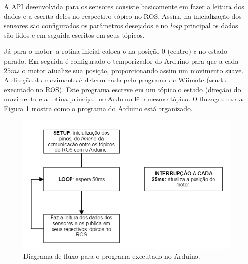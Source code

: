 A API desenvolvida para os sensores consiste basicamente em fazer a leitura dos dados e a escrita deles no respectivo tópico no ROS. Assim, na inicialização dos sensores são configurados os parâmetros desejados e no \textit{loop} principal os dados são lidos e em seguida escritos em seus tópicos.

Já para o motor, a rotina inicial coloca-o na posição 0 (centro) e no estado parado. Em seguida é configurado o temporizador do Arduino para que a cada $25 ms$ o motor atualize sua posição, proporcionando assim um movimento suave. A direção do movimento é determinada pelo programa do Wiimote (sendo executado no ROS). Este programa escreve em um tópico o estado (direção) do movimento e a rotina principal no Arduino lê o mesmo tópico. O fluxograma da Figura \ref{fig:flowchartProgramaArduino} mostra como o programa do Arduino está organizado.

\begin{figure}[H]
\centering
  \includegraphics[scale=.5]{images/programaArduino.png} 
\caption{\small{Diagrama de fluxo para o programa executado no Arduino.}}
\label{fig:flowchartProgramaArduino}
\end{figure} 
